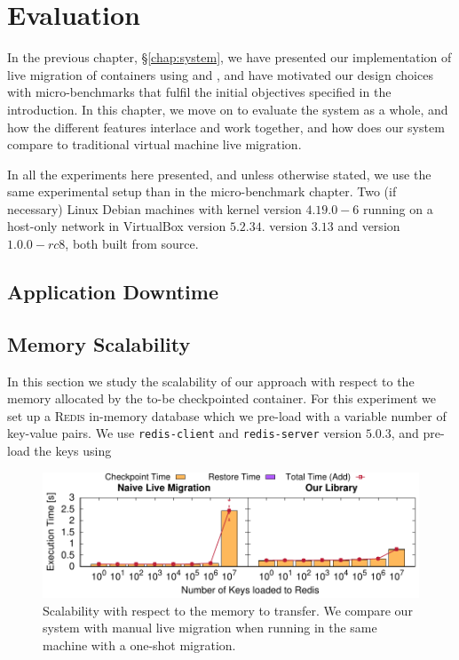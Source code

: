 \chapter{Evaluation} \label{chap:evaluation}

In the previous chapter, \S\ref{chap:system}, we have presented our implementation of live migration of containers using \criu and \runc, and have motivated our design choices with micro-benchmarks that fulfil the initial objectives specified in the introduction.
In this chapter, we move on to evaluate the system as a whole, and how the different features interlace and work together, and  how does our system compare to traditional virtual machine live migration.

In all the experiments here presented, and unless otherwise stated, we use the same experimental setup than in the micro-benchmark chapter.
Two (if necessary) Linux Debian machines with kernel version $4.19.0-6$ running on a host-only network in VirtualBox version $5.2.34$.
\criu version $3.13$ and \runc version $1.0.0-rc8$, both built from source.

\section{Application Downtime}



\section{Memory Scalability}

In this section we study the scalability of our approach with respect to the memory allocated by the to-be checkpointed container.
For this experiment we set up a \textsc{Redis} in-memory database which we pre-load with a variable number of key-value pairs.
We use \texttt{redis-client} and \texttt{redis-server} version $5.0.3$, and pre-load the keys using 

\begin{figure}[h!]
    \centering
    \includegraphics[width=\textwidth]{figs/key-scalability/key_scalability.pdf}
    \caption[Scalability with respect to the memory to transfer.]{Scalability with respect to the memory to transfer. We compare our system with manual live migration when running in the same machine with a one-shot migration.\label{fig:key-scalability}}
\end{figure}

